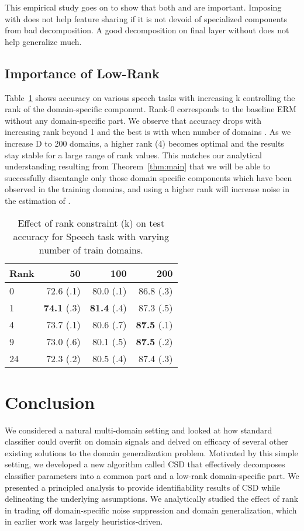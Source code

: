 \documentclass{article}
\begin{document}
This empirical study goes on to show that both  and  are important. Imposing  with  does not help feature sharing if it is not devoid of specialized components from bad decomposition. A good decomposition on final layer without  does not help generalize much. 

\subsection{Importance of Low-Rank}
\label{sec:lowrank}
Table~\ref{tab:speech:k} shows accuracy on various speech tasks with increasing k controlling the rank of the domain-specific component.  Rank-0 corresponds to the baseline ERM without any domain-specific part.  We observe that accuracy drops with increasing rank beyond 1 and the best is with  when number of domains .  As we increase D to 200 domains, a higher rank (4) becomes optimal and the results stay stable for a large range of rank values.  This matches our analytical understanding resulting from Theorem~\ref{thm:main} that we will be able to successfully disentangle only those domain specific components which have been observed in the training domains, and using a higher rank will increase noise in the estimation of .




\begin{table}[htb]
    \centering
    \begin{tabular}{|l|r|r|r|}
    \hline
    Rank  & 50 & 100 & 200 \\
    \hline
    0  &   72.6 (.1) & 80.0 (.1) & 86.8 (.3)  \\           
    1 & \textbf{74.1} (.3) &  \textbf{81.4} (.4) & 87.3 (.5) \\
    4 & 73.7 (.1) & 80.6 (.7) &  \textbf{ 87.5} (.1) \\
    9 & 73.0 (.6) & 80.1 (.5) &  \textbf{  87.5} (.2) \\
    24 & 72.3 (.2) & 80.5 (.4) & 87.4 (.3) \\
    \hline
    \end{tabular}
    \caption{Effect of rank constraint (k) on test accuracy for Speech task with varying number of train domains.}
    \label{tab:speech:k}
\end{table}

\section{Conclusion}


We considered a natural multi-domain setting and looked at how standard classifier could overfit on domain signals and delved on efficacy of several other existing solutions to the domain generalization problem. 
Motivated by this simple setting, we developed a new algorithm called CSD that effectively decomposes classifier parameters into a common part and a low-rank domain-specific part.  
We presented a principled analysis to provide identifiability results of CSD while delineating the underlying assumptions.
We analytically studied the effect of rank in trading off domain-specific noise suppression and domain generalization, which in earlier work was largely heuristics-driven. 
 
\end{document}
